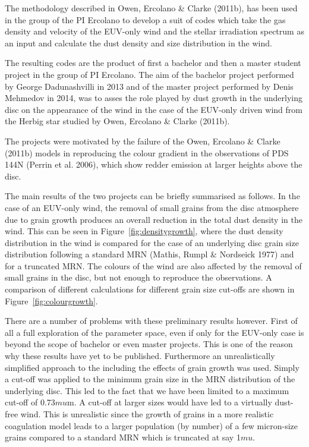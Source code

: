 \documentclass[10pt,fleqn,twoside]{article}
\begin{document}
The methodology described in Owen, Ercolano \& Clarke (2011b), has been
used in the group of the PI Ercolano to develop a suit of codes which
take the gas density and velocity of the EUV-only wind and the stellar
irradiation spectrum as an input and calculate the dust density and
size distribution in the wind. 

The resulting codes are the product of first a bachelor and then a master
student project in the group of PI Ercolano. The aim of the bachelor project
performed by George Dadunashvilli in 2013 and of the master project
performed  by Denis Mehmedov in 2014, was to asses the role played by
dust growth in the underlying disc on the appearance of the wind in
the case of the EUV-only driven wind from the Herbig star studied by
Owen, Ercolano \& Clarke (2011b). 

The projects were motivated by the failure of the Owen, Ercolano \&
Clarke (2011b) models in reproducing the colour gradient in the observations
of  PDS 144N (Perrin et al. 2006), which show redder emission at
larger heights above the disc. 

The main results of the two projects can be briefly summarised as follows. 
In the case of an EUV-only wind, the removal of small grains from the disc atmosphere due to grain
growth produces an overall reduction in the total dust density in the
wind. This can be seen in Figure~\ref{fig:densitygrowth}, where the
dust density distribution in the wind is compared for the case of an
underlying disc grain size distribution following a 
standard MRN (Mathis, Rumpl \& Nordseick 1977) and for a truncated 
MRN. The colours of the wind are also affected by the removal of small
grains in the disc, but not enough to reproduce the observations. A
comparison of different calculations for different grain size cut-offs
are shown in Figure~\ref{fig:colourgrowth}. 

There are a number of problems with these preliminary results
however. First of all
a full exploration of the parameter space, even if only for the
EUV-only case is beyond the scope of bachelor or even master
projects. This is one of the reason why these results have yet to be 
published. Furthermore an unrealistically simplified approach to the 
including the effects of grain growth was used. Simply a cut-off was
applied to the minimum grain size in the MRN distribution of the
underlying disc. This led to the fact that we have been limited to a
maximum cut-off of 0.73$mu$m. A cut-off at larger sizes would have led
to a virtually dust-free wind. This is unrealistic since the growth of
grains in a more realistic coagulation model leads to a larger population (by
number) of a few micron-size grains compared to a standard MRN which
is truncated at say 1$mu$. 
\end{document}
